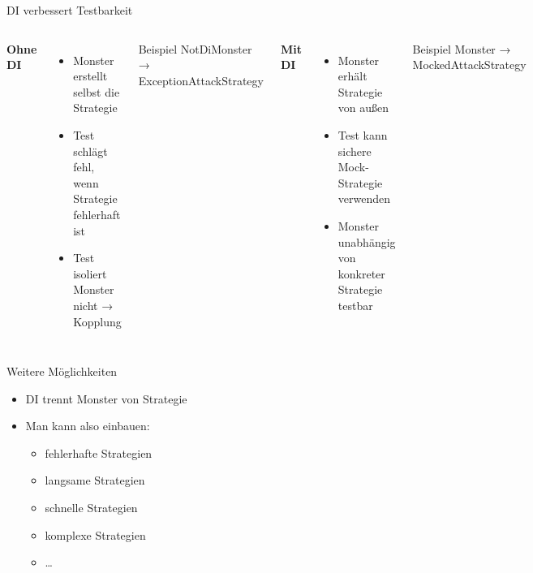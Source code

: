 \begin{frame}{DI verbessert Testbarkeit}
	\begin{columns}[T,onlytextwidth]
		\textbf{Ohne DI}
		\begin{itemize}
		    \item Monster erstellt selbst die Strategie
		    \item Test schlägt fehl, wenn Strategie fehlerhaft ist
		    \item Test isoliert Monster nicht → Kopplung
		\end{itemize}
		
		\begin{exampleblock}{Beispiel}
			NotDiMonster → ExceptionAttackStrategy
		\end{exampleblock}
		
		\textbf{Mit DI}
		\begin{itemize}
		    \item Monster erhält Strategie von außen
		    \item Test kann sichere Mock-Strategie verwenden
		    \item Monster unabhängig von konkreter Strategie testbar
		\end{itemize}
		
		\begin{exampleblock}{Beispiel}
			Monster → MockedAttackStrategy
		\end{exampleblock}
	\end{columns}
\end{frame}

\begin{frame}{Weitere Möglichkeiten}
	\begin{itemize}
	  \item DI trennt Monster von Strategie
	  \item Man kann also einbauen:
	  	\begin{itemize}
	  	  \item fehlerhafte Strategien
	  	  \item langsame Strategien
	  	  \item schnelle Strategien
	  	  \item komplexe Strategien
	  	  \item \ldots
	  	\end{itemize}
	\end{itemize}
\end{frame}

